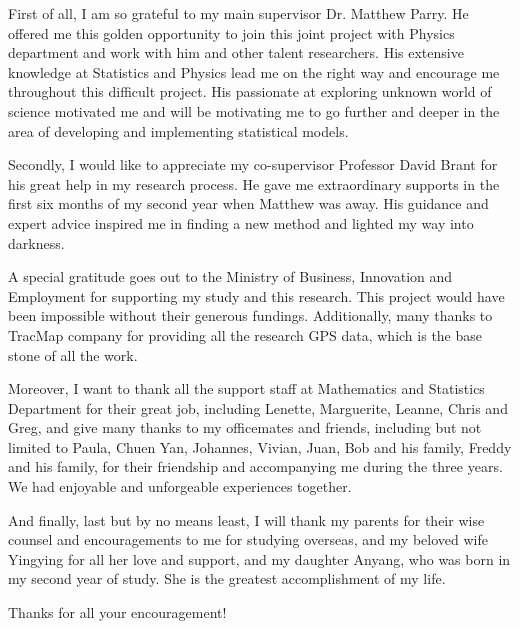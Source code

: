 First of all, I am so grateful to my main supervisor Dr. Matthew Parry. He offered me this golden opportunity to join this joint project with Physics department and work with him and other talent researchers. His extensive knowledge at Statistics and Physics lead me on the right way and encourage me throughout this difficult project. His passionate at exploring unknown world of science motivated me and will be motivating me to go further and deeper in the area of developing and implementing statistical models.  

Secondly, I would like to appreciate my co-supervisor Professor David Brant for his great help in my research process. He gave me extraordinary supports in the first six months of my second year when Matthew was away. His guidance and expert advice inspired me in finding a new method and lighted my way into darkness. 

A special gratitude goes out to the Ministry of Business, Innovation and Employment for supporting my study and this research. This project would have been impossible without their generous fundings. Additionally, many thanks to TracMap company for providing all the research GPS data, which is the base stone of all the work. 

Moreover, I want to thank all the support staff at Mathematics and Statistics Department for their great job, including Lenette, Marguerite, Leanne, Chris and Greg, and give many thanks to my officemates and friends, including but not limited to Paula, Chuen Yan, Johannes, Vivian, Juan, Bob and his family, Freddy and his family, for their friendship and accompanying me during the three years. We had enjoyable and unforgeable experiences together. 

And finally, last but by no means least, I will thank my parents for their wise counsel and encouragements to me for studying overseas, and my beloved wife Yingying for all her love and support, and my daughter Anyang, who was born in my second year of study. She is the greatest accomplishment of my life.

Thanks for all your encouragement! 

